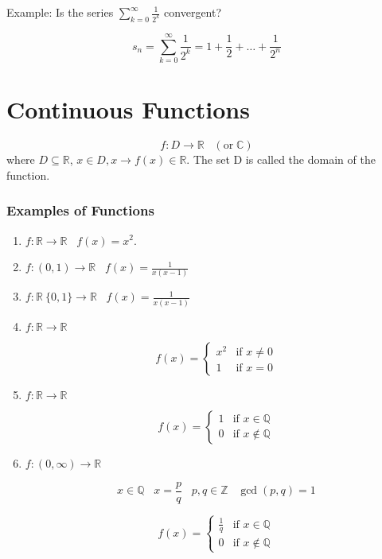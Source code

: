 \message{ !name(RealAnalysis.tex)}\documentclass[12pt]{scrbook}
\begin{document}
Example: Is the series $\sum_{k=0}^{\infty} \frac{1}{2^k} $
convergent?

\[ s_n = \sum_{k=0}^{\infty} \frac{1}{2^k} = 1 + \frac{1}{2} + \ldots
+ \frac{1}{2^n}  \]


\clearpage

\chapter{Continuous Functions}

\[ f : D \rightarrow \mathbb{R} \;\;\; (\text{or} \; \mathbb{C}) \] 
where $D \subseteq \mathbb{R} $,  $x \in D, x \rightarrow f(x) \in \mathbb{R} $.
The set D is called the domain of the function.

\subsection{Examples of Functions}

\begin{enumerate}
	\item
	 $ f : \mathbb{R} \rightarrow \mathbb{R} \;\;\; f(x) = x^2 $.

	\item 
	$f : (0, 1)  \rightarrow \mathbb{R} \;\;\; f(x) = \frac{1}{x(x-1)} $

	\item 
	$f : \mathbb{R} \ \{0,1\} \rightarrow \mathbb{R} \;\;\; f(x) = \frac{1}{x(x-1)} $
	
	\item 
	$f : \mathbb{R} \rightarrow \mathbb{R} $
	
	\[ 
	f(x) = \left\{ \begin{array}{ll}
         x^2 & \mbox{if $x \neq 0$} \\
        1 & \mbox{if $x = 0$}
         \end{array} 
         \right. 
         \] 
         
         \item
         $f : \mathbb{R} \rightarrow \mathbb{R} $
         
         	\[ 
	f(x) = \left\{ \begin{array}{ll}
         1 & \mbox{if $x \in \mathbb{Q} $} \\
         0 & \mbox{if $x \notin \mathbb{Q} $}
         \end{array} 
         \right. 
         \] 
	
	\item
         $f : (0, \infty) \rightarrow \mathbb{R} $
         
         \[ x \in \mathbb{Q} \;\;\; x = \frac{p}{q} \;\;\; p, q \in \mathbb{Z} \;\;\; \gcd(p, q) = 1 \] 
         
         	\[ 
	f(x) = \left\{ \begin{array}{ll}
         \frac{1}{q} & \mbox{if $x \in \mathbb{Q} $} \\
         0 & \mbox{if $x \notin \mathbb{Q} $}
         \end{array} 
         \right. 
         \] 

\end{enumerate}
\end{document}

